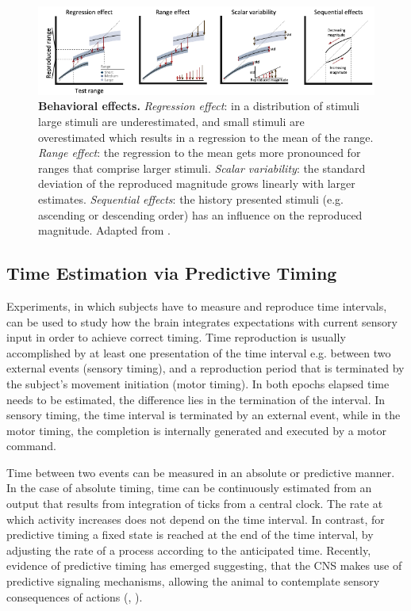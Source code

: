 \documentclass[10pt]{article}
\begin{document}
\begin{figure}[ht]
	\centering
	\includegraphics[width=\textwidth]{figures/behavioural_effects_petzschner.pdf}
	\caption{\textbf{Behavioral effects.} 
	\textit{Regression effect}: in a distribution of stimuli large stimuli are underestimated, and small stimuli are overestimated which results in a regression to the mean of the range.
	\textit{Range effect}: the regression to the mean gets more pronounced for ranges that comprise larger stimuli. 
	\textit{Scalar variability}: the standard deviation of the reproduced magnitude grows linearly with larger estimates. 
	\textit{Sequential effects}: the history presented stimuli (e.g. ascending or descending order) has an influence on the reproduced magnitude. 
	Adapted from \cite{Petzschner2015}.}
	\label{fig:behavioraleffects}
\end{figure}

\subsection{Time Estimation via Predictive Timing}
Experiments, in which subjects have to measure and reproduce time intervals, can be used  to study how the brain integrates expectations with current sensory input in order to achieve correct timing.
Time reproduction is usually accomplished by at least one presentation of the time interval e.g. between two external events (sensory timing), and a reproduction period that is terminated by the subject's movement initiation (motor timing).
In both epochs elapsed time needs to be estimated, the difference lies in the termination of the interval. In sensory timing, the time interval is terminated by an external event, while in the motor timing, the completion is internally generated and executed by a motor command.

Time between two events can be measured in an absolute or predictive manner. 
In the case of absolute timing, time can be continuously estimated from an output that results from integration of ticks from a central clock.
The rate at which activity increases does not depend on the time interval.
In contrast, for predictive timing a fixed state is reached at the end of the time interval, by adjusting the rate of a process according to the anticipated time.
Recently, evidence of predictive timing has emerged suggesting, that the CNS  makes use of predictive signaling mechanisms, allowing the animal to contemplate sensory consequences of actions (\cite{Meirhaeghe2021}, \cite{Egger2019}).
\end{document}

